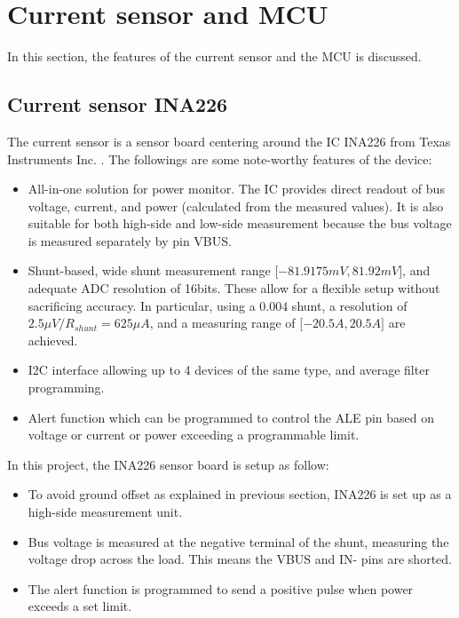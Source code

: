 \documentclass[../main.tex]{subfiles}
\begin{document}
    \section{Current sensor and MCU}
    In this section, the features of the current sensor and the MCU is discussed.

    \subsection{Current sensor INA226}
    \justify
    The current sensor is a sensor board centering around the IC INA226 from Texas Instruments Inc. \cite{INA226}. The followings are some note-worthy features of the device:
    \begin{itemize}
        \item All-in-one solution for power monitor. The IC provides direct readout of bus voltage, current, and power (calculated from the measured values). It is also suitable for both high-side and low-side measurement because the bus voltage is measured separately by pin VBUS.
        \item Shunt-based, wide shunt measurement range $\lbrack-81.9175mV, 81.92mV\rbrack$, and adequate ADC resolution of 16bits. These allow for a flexible setup without sacrificing accuracy. In particular, using a $0.004$ shunt, a resolution of $2.5\mu V / R_{shunt} = 625 \mu A$, and a measuring range of $\lbrack-20.5A, 20.5A\rbrack$ are achieved.
        \item I2C interface allowing up to 4 devices of the same type, and average filter programming.
        \item Alert function which can be programmed to control the ALE pin based on voltage or current or power exceeding a programmable limit.
    \end{itemize}

    \justify
    In this project, the INA226 sensor board is setup as follow:
    \begin{itemize}
        \item To avoid ground offset as explained in previous section, INA226 is set up as a high-side measurement unit.
        \item Bus voltage is measured at the negative terminal of the shunt, measuring the voltage drop across the load. This means the VBUS and IN- pins are shorted.
        \item The alert function is programmed to send a positive pulse when power exceeds a set limit.
    \end{itemize} 
\end{document}
